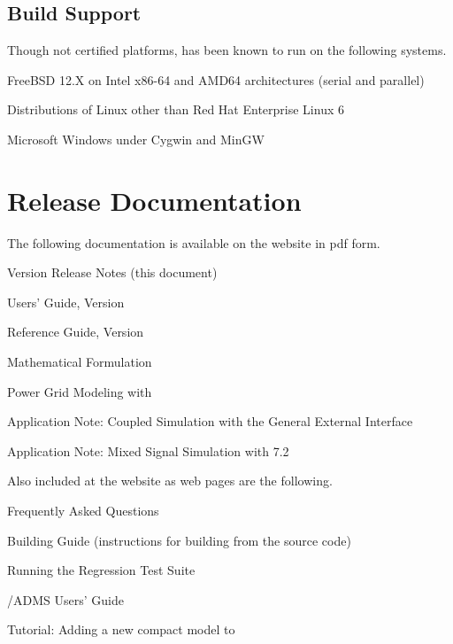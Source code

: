 \documentclass[letterpaper]{scrartcl}
\begin{document}
\subsection*{Build Support}
Though not certified platforms, \Xyce{} has been known to run on the following
systems.
\begin{XyceItemize}
  \item FreeBSD 12.X on Intel x86-64 and AMD64 architectures (serial
    and parallel)
  \item Distributions of Linux other than Red Hat Enterprise Linux 6
  \item Microsoft Windows under Cygwin and MinGW
\end{XyceItemize}


\section{\Xyce{} Release \XyceVersionVar{} Documentation}
The following \Xyce{} documentation is available on the \Xyce{} website in pdf
form.
\begin{XyceItemize}
  \item \Xyce{} Version \XyceVersionVar{} Release Notes (this document)
  \item \Xyce{} Users' Guide, Version \XyceVersionVar{}
  \item \Xyce{} Reference Guide, Version \XyceVersionVar{}
  \item \Xyce{} Mathematical Formulation
  \item Power Grid Modeling with \Xyce{}
  \item Application Note: Coupled Simulation with the \Xyce{} General
    External Interface
  \item Application Note: Mixed Signal Simulation with \Xyce{} 7.2
\end{XyceItemize}
Also included at the \Xyce{} website as web pages are the following.
\begin{XyceItemize}
  \item Frequently Asked Questions
  \item Building Guide (instructions for building \Xyce{} from the source code)
  \item Running the \Xyce{} Regression Test Suite
  \item \Xyce{}/ADMS Users' Guide
  \item Tutorial:  Adding a new compact model to \Xyce{}
\end{XyceItemize}
\end{document}
